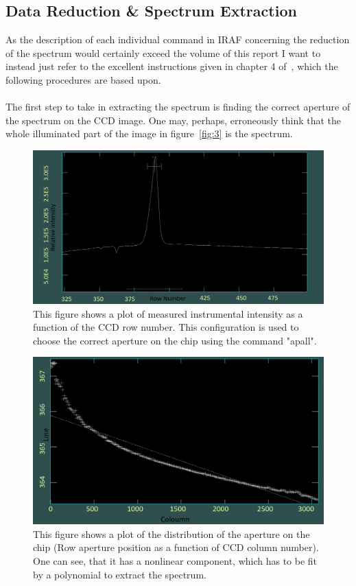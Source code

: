 \documentclass{article}
\begin{document}
\subsection{Data Reduction \& Spectrum Extraction}
\label{ss:2}
As the description of each individual command in IRAF concerning the reduction of the spectrum would certainly exceed the volume of this report I want to instead just refer to the excellent instructions given in chapter 4 of~\parencite{IRAF_Manual}, which the following procedures are based upon.\\\\The first step to take in extracting the spectrum is finding the correct aperture of the spectrum on the CCD image. One may, perhaps, erroneously think that the whole illuminated part of the image in figure~\ref{fig:3} is the spectrum.
\begin{figure}[H]
  	\centering
    \includegraphics[width=1.00\textwidth]{spectroscopy/aperture_choosing.jpg}
  	\caption{This figure shows a plot of measured instrumental intensity as a function of the CCD row number. This configuration is used to choose the correct aperture on the chip using the command "apall".}
  	\label{fig:4}
\end{figure}
\begin{figure}[H]
	\centering
    \includegraphics[width=1.00\textwidth]{spectroscopy/aperture_fitting.jpg}
  	\caption{This figure shows a plot of the distribution of the aperture on the chip (Row aperture position as a function of CCD column number). One can see, that it has a nonlinear component, which has to be fit by a polynomial to extract the spectrum.}
  	\label{fig:5}
\end{figure}
\end{document}
